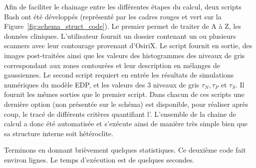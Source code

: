 \documentclass[main.tex]{subfiles}
\begin{document}
Afin de faciliter le chainage entre les différentes étapes du calcul, deux scripts Bash ont été développés (représenté par les cadres rouges et vert sur la Figure~\ref{fig:schema_struct_code}). Le premier permet de traiter de A à Z, les données cliniques. L'utilisateur fournit un dossier contenant un ou plusieurs scanners avec leur contourage provenant d'OsiriX. Le script fournit en sortie, des images post-traitées ainsi que les valeurs des histogrammes des niveaux de gris correspondant aux zones contourées et leur description en mélanges de gaussiennes. Le second script requiert en entrée les résultats de simulations numériques du modèle EDP, et les valeurs des 3 niveaux de gris $\tau_N, \tau_P$ et $\tau_S$. Il fournit les mêmes sorties que le premier script. 
Dans chacun de ces scripts une dernière option (non présentée sur le schéma) est disponible, pour réaliser après coup, le tracé de différents critères quantifiant l'\hetero. 
L'ensemble de la chaine de calcul a donc été automatisée et s'exécute ainsi de manière très simple bien que sa structure interne soit hétéroclite. 


Terminons en donnant brièvement quelques statistiques. Ce deuxième code fait environ  lignes. Le temps d'exécution est de quelques secondes.
 
\end{document}
